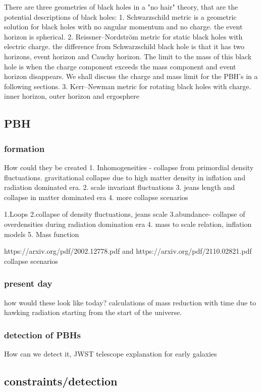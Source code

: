 \documentclass{article}
\begin{document}
There are three geometries of black holes in a "no hair" theory, that are the potential descriptions of black holes:
1. Schwarzschild metric is a geometric solution for black holes with no angular momentum and no charge. the event horizon is spherical. 
2. Reissner–Nordström metric for static black holes with electric charge. the difference from Schwarzschild black hole is that it has two horizons, event horizon and Cauchy horizon. The limit to the mass of this black hole is when the charge component exceeds the mass component and event horizon disappears. We shall discuss the charge and mass limit for the PBH's in a following sections. 
3. Kerr–Newman metric for rotating black holes with charge. inner horizon, outer horizon and ergosphere 


\subsection {PBH}
\subsubsection {formation} How could they be created
1. Inhomogeneities - collapse from primordial density fluctuations. gravitational collapse due to high matter density in inflation and radiation dominated era.
2. scale invariant fluctuations 
3. jeans length and collapse in matter dominated era 
4. more collapse scenarios 


1.Loops
2.collapse of density fluctuations, jeans scale 
3.abundance- collapse of overdensities during radiation domination era
4. mass to scale relation, inflation models 
5. Mass function 

https://arxiv.org/pdf/2002.12778.pdf and https://arxiv.org/pdf/2110.02821.pdf    collapse scenarios 

\subsubsection {present day} how would these look like today? calculations of mass reduction with time due to hawking radiation starting from the start of the universe. 

\subsubsection {detection of PBHs} How can we detect it, JWST telescope explanation for early galaxies

\subsection {constraints/detection}
\end{document}
